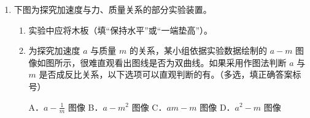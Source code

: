 \documentclass[\gkver]{gaokaozhenti}
\begin{document}
\begin{enumerate}
{C．设滑块从释放到静止运动的位移为 $x$，滑块开始向下做加速度减小的减速运动，当沿着杆方向合力为 $0$ 时，滑块速度最大，之后滑块继续向下做加速度增大的减速运动，当速度为 $0$ 时，有

$mg\sin 53^\circ \cdot x = fx + \frac{1}{2}k\left(PQ^{2} + x^{2}\right) - \frac{1}{2}kPQ^{2}$

由几何关系可得 $x = 1.28 \Um$

此时 $k\sqrt{PQ^{2} + x^{2}} \cdot \frac{x}{\sqrt{PQ^{2} + x^{2}}} = 12.8 \UN > mg\sin 53^\circ + f$

则滑块会继续向上滑动，做加速度减小的加速运动。当滑块速度再次为 $0$ 时，有

$\frac{1}{2}k\left(PQ^{2} + x^{2}\right) - \frac{1}{2}k\left[PQ^{2} + (x - x_{1})^{2}\right] = mg\sin 53^\circ x_{1} + fx_{1}$

解得 $x_{1} = 0.64 \Um$

此时 $x' = x - x_{1} = 0.64 \Um$

此时 $k\sqrt{PQ^{2} + x'^{2}} \cdot \frac{x'}{\sqrt{PQ^{2} + x'^{2}}} = 6.4 \UN = mg\sin 53^\circ - f$

则滑块静止，故从释放到静止，滑块的位移为 $x' = 0.64 \Um$，故 C 正确；

D．从释放到静止，设克服滑动摩擦力做功为 $W_{\mathrm{f}}$，由能量守恒定律有

$mg\sin 53^\circ \cdot x' = \frac{1}{2}k\left(PQ^{2} + x'^{2} - PQ^{2}\right) + W_{\mathrm{f}}$

解得 $W_{\mathrm{f}} = 3.072 \UJ$

故 D 错误。

故选 AC。
}

\item
下图为探究加速度与力、质量关系的部分实验装置。
\begin{enumerate}
	\item
	实验中应将木板（填“保持水平”或“一端垫高”）。
	\item
	为探究加速度 $a$ 与质量 $m$ 的关系，某小组依据实验数据绘制的 $a-m$ 图像如图所示，很难直观看出图线是否为双曲线。如果采用作图法判断 $a$ 与 $m$ 是否成反比关系，以下选项可以直观判断的有。（多选，填正确答案标号）

	A．$a-\frac{1}{m}$ 图像 \quad B．$a-m^{2}$ 图像 \quad C．$am-m$ 图像 \quad D．$a^{2}-m$ 图像


\end{enumerate}
\end{enumerate}
\end{document}
